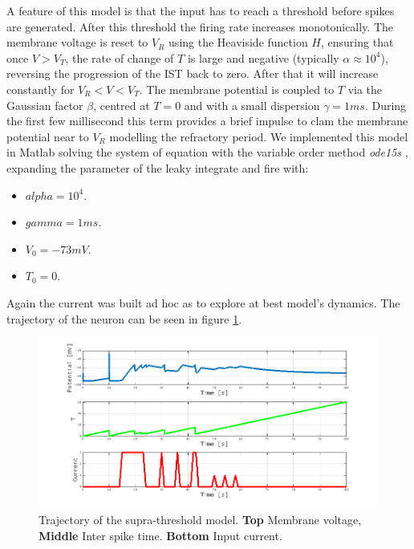 		A feature of this model is that the input has to reach a threshold before spikes are generated.
		After this threshold the firing rate increases monotonically.
		The membrane voltage is reset to $V_R$ using the Heaviside function $H$, ensuring that once $V>V_T$, the rate of change of $T$ is large and negative (typically $\alpha\approx 10^4$), reversing the progression of the IST back to zero.
		After that it will increase constantly for $V_R<V<V_T$.
		The membrane potential is coupled to $T$ via the Gaussian factor $\beta$, centred at $T=0$ and with a small dispersion $\gamma=1ms$.
		During the first few millisecond this term provides a brief impulse to clam the membrane potential near to $V_R$ modelling the refractory period.
		We implemented this model in Matlab solving the system of equation with the variable order method \emph{ode15s} \cite{ode15s}, expanding the parameter of the leaky integrate and fire with:

		\begin{multicols}{2}
			\begin{itemize}
				\item $alpha = 10^4$.
				\item $gamma = 1ms$.
				\item $V_0 = -73mV$.
				\item $T_0 = 0$.
			\end{itemize}
		\end{multicols}

		Again the current was built ad hoc as to explore  at best model's dynamics.
		The trajectory of the neuron can be seen in figure \ref{fig:supra-threshold}.

		\begin{figure}
			\includegraphics[width=\textwidth]{Figures/supra-threshold}
			\caption{Trajectory of the supra-threshold model. \textbf{Top} Membrane voltage, \textbf{Middle} Inter spike time. \textbf{Bottom} Input current.}
			\label{fig:supra-threshold}
		\end{figure}

